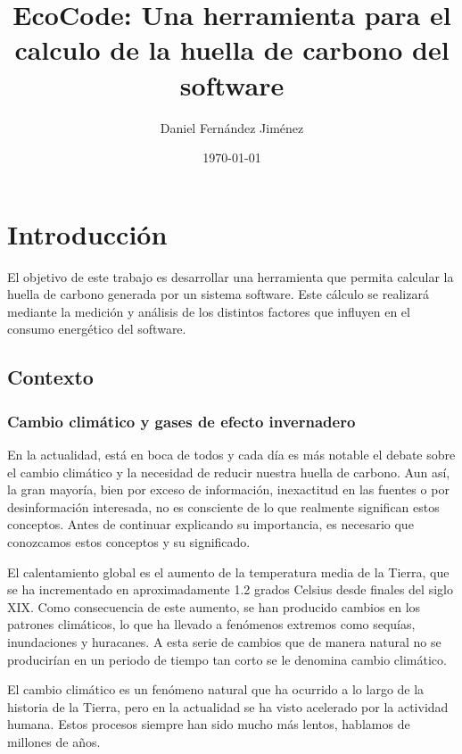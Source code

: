 \documentclass[12pt,a4paper]{report}
\title{EcoCode: Una herramienta para el calculo de la huella de carbono del software}
\author{Daniel Fernández Jiménez}
\date{\today}
\begin{document}
\maketitle

\tableofcontents
\newpage

\chapter{Introducción}

El objetivo de este trabajo es desarrollar una herramienta que permita calcular la huella de carbono generada por un sistema software. Este cálculo se realizará mediante la medición y análisis de los distintos 
factores que influyen en el consumo energético del software.

\section{Contexto}

\subsection{Cambio climático y gases de efecto invernadero}

En la actualidad, está en boca de todos y cada día es más notable el debate sobre el cambio climático y la necesidad de reducir nuestra huella de carbono. Aun así, la gran mayoría, bien por exceso de información, 
inexactitud en las fuentes o por desinformación interesada, no es consciente de lo que realmente significan estos conceptos. Antes de continuar explicando su importancia, es necesario que conozcamos estos 
conceptos y su significado.

El calentamiento global es el aumento de la temperatura media de la Tierra, que se ha incrementado en aproximadamente 1.2 grados Celsius desde finales del siglo XIX. Como consecuencia de este aumento, se han 
producido cambios en los patrones climáticos, lo que ha llevado a fenómenos extremos como sequías, inundaciones y huracanes. A esta serie de cambios que de manera natural no se producirían en un periodo de 
tiempo tan corto se le denomina cambio climático.

El cambio climático es un fenómeno natural que ha ocurrido a lo largo de la historia de la Tierra, pero en la actualidad se ha visto acelerado por la actividad humana. Estos procesos siempre han sido mucho más 
lentos, hablamos de millones de años.
\end{document}
